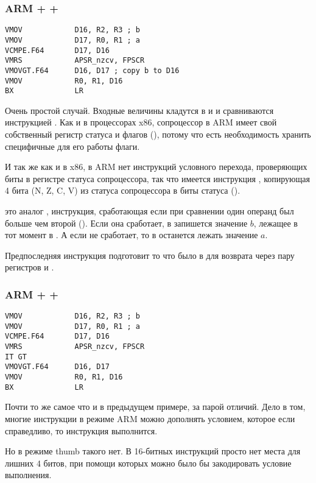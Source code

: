 ﻿\subsubsection{ARM + \OptimizingXcode + \ARMMode}

\begin{lstlisting}
VMOV            D16, R2, R3 ; b
VMOV            D17, R0, R1 ; a
VCMPE.F64       D17, D16
VMRS            APSR_nzcv, FPSCR
VMOVGT.F64      D16, D17 ; copy b to D16
VMOV            R0, R1, D16
BX              LR
\end{lstlisting}

Очень простой случай. Входные величины кладутся в  и  и сравниваются инструкцией 
.
Как и в процессорах x86, сопроцессор в ARM имеет свой собственный регистр статуса и флагов (),
потому что есть необходимость хранить специфичные для его работы флаги.

И так же как и в x86, в ARM нет инструкций условного перехода, 
проверяющих биты в регистре статуса сопроцессора, так что имеется инструкция , копирующая 4 бита
(N, Z, C, V) из статуса сопроцессора в биты  статуса ().

 это аналог , инструкция, сработающая если при сравнении один операнд 
был больше чем второй
(). Если она сработает, в  запишется значение $b$, лежащее в тот момент 
в .
А если не сработает, то в  останется лежать значение $a$.

Предпоследняя инструкция подготовит то что было в  для возврата через пару регистров \Rzero 
и \Rone.

\subsubsection{ARM + \OptimizingXcode + \ThumbTwoMode}

\begin{lstlisting}
VMOV            D16, R2, R3 ; b
VMOV            D17, R0, R1 ; a
VCMPE.F64       D17, D16
VMRS            APSR_nzcv, FPSCR
IT GT 
VMOVGT.F64      D16, D17
VMOV            R0, R1, D16
BX              LR
\end{lstlisting}

Почти то же самое что и в предыдущем примере, за парой отличий. Дело в том, многие инструкции в режиме ARM
можно дополнять условием, которое если справедливо, то инструкция выполнится.

Но в режиме thumb такого нет. В 16-битных инструкций просто нет места для лишних 4 битов, при помощи
которых можно было бы закодировать условие выполнения.

